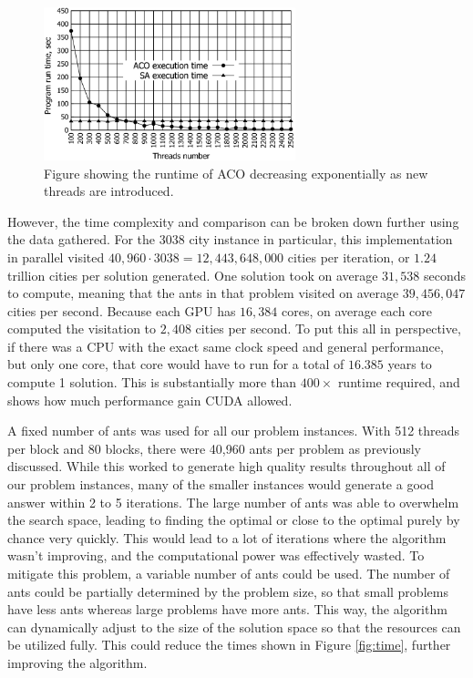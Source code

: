 \documentclass[11pt]{report}
\begin{document}
            \begin{figure}[h!]
                \centering
                \includegraphics[width=0.65\textwidth,keepaspectratio]{Images/Run-time-of-ACO}
                \caption{Figure showing the runtime of ACO decreasing exponentially as new threads are introduced.}
                \label{fig:aco-runtime}
            \end{figure}
            \noindent However, the time complexity and comparison can be broken down further using the data gathered. For the 3038 city instance in particular, this implementation in parallel visited $40,960 \cdot 3038 = 12,443,648,000$ cities per iteration, or $1.24$ trillion cities per solution generated. One solution took on average $31,538$ seconds to compute, meaning that the ants in that problem visited on average $39,456,047$ cities per second. Because each GPU has $16,384$ cores, on average each core computed the visitation to $2,408$ cities per second. To put this all in perspective, if there was a CPU with the exact same clock speed and general performance, but only one core, that core would have to run for a total of $16.385$ years to compute 1 solution. This is substantially more than $400\times$ runtime required, and shows how much performance gain CUDA allowed.  
            
            A fixed number of ants was used for all our problem instances. With 512 threads per block and 80 blocks, there were 40,960 ants per problem as previously discussed. While this worked to generate high quality results throughout all of our problem instances, many of the smaller instances would generate a good answer within 2 to 5 iterations. The large number of ants was able to overwhelm the search space, leading to finding the optimal or close to the optimal purely by chance very quickly. This would lead to a lot of iterations where the algorithm wasn't improving, and the computational power was effectively wasted. To mitigate this problem, a variable number of ants could be used. The number of ants could be partially determined by the problem size, so that small problems have less ants whereas large problems have more ants. This way, the algorithm can dynamically adjust to the size of the solution space so that the resources can be utilized fully. This could reduce the times shown in Figure \ref{fig:time}, further improving the algorithm.
\end{document}
